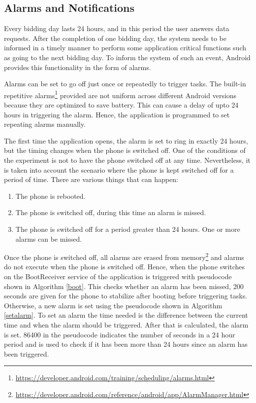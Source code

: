 \subsection{Alarms and Notifications} \label{alarm}

Every bidding day lasts 24 hours, and in this period the user answers data requests. After the completion of one bidding day, the system needs to be informed in a timely manner to perform some application critical functions such as going to the next bidding day. To inform the system of such an event, Android provides this functionality in the form of alarms. 

Alarms can be set to go off just once or repeatedly to trigger tasks.
The built-in repetitive alarms\footnote{\url{https://developer.android.com/training/scheduling/alarms.html}} provided are not uniform across different Android versions because they are optimized to save battery. This can cause a delay of upto 24 hours in triggering the alarm. Hence, the application is programmed to set repeating alarms manually. 

The first time the application opens, the alarm is set to ring in exactly 24 hours, but the timing changes when the phone is switched off.
One of the conditions of the experiment is not to have the phone switched off at any time. Nevertheless, it is taken into account the scenario where
the phone is kept switched off for a period of time. There are various things that can happen:

\begin{enumerate}
	\item The phone is rebooted.
	\item The phone is switched off, during this time an alarm is missed.
    \item The phone is switched off for a period greater than 24 hours. One or more alarms can be missed.
\end{enumerate}

Once the phone is switched off, all alarms are erased from memory\footnote{\url{https://developer.android.com/reference/android/app/AlarmManager.html}} and alarms do not execute when the phone is switched off. Hence, when the phone switches on the
BootReceiver service of the application is triggered with pseudocode shown in Algorithm \ref{boot}. This checks whether an alarm has been missed, 200 seconds are given for the phone to stabilize after booting before triggering tasks. Otherwise, a new alarm is set using the pseudocode shown in Algorithm \ref{setalarm}. To set an alarm the time needed is the difference between the current time and when the alarm should be triggered. After that is calculated, the alarm is set. 86400 in the pseudocode indicates the number of seconds in a 24 hour period and is used to check if it has been more than 24 hours since an alarm has been triggered.

